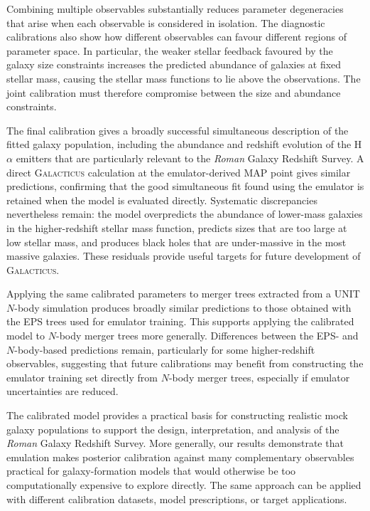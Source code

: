 \documentclass[twocolumn, apj, numberedappendix, iop]{openjournal}
\newcommand{\galacticus}{\textsc{Galacticus}\xspace}
\newcommand{\romanspace}{\textit{Roman}\xspace}
\newcommand{\ha}{H$\alpha$}
\begin{document}
Combining multiple observables substantially reduces parameter degeneracies
that arise when each observable is considered in isolation. The diagnostic
calibrations also show how different observables can favour different regions
of parameter space. In particular, the weaker stellar feedback favoured by
the galaxy size constraints increases the predicted abundance of galaxies at
fixed stellar mass, causing the stellar mass functions to lie above the
observations. The joint calibration must therefore compromise between the
size and abundance constraints.

The final calibration gives a broadly successful simultaneous description of
the fitted galaxy population, including the abundance and redshift evolution
of the \ha{} emitters that are particularly relevant to the \romanspace{} Galaxy
Redshift Survey. A direct \galacticus{} calculation at the emulator-derived
MAP point gives similar predictions, confirming that the good simultaneous
fit found using the emulator is retained when the model is evaluated directly.
Systematic discrepancies nevertheless remain: the model overpredicts the
abundance of lower-mass galaxies in the higher-redshift stellar mass function,
predicts sizes that are too large at low stellar mass, and produces black
holes that are under-massive in the most massive galaxies. These residuals
provide useful targets for future development of \galacticus{}.

Applying the same calibrated parameters to merger trees extracted from a UNIT
\(N\)-body simulation produces broadly similar predictions to those obtained
with the EPS trees used for emulator training. This supports applying the
calibrated model to \(N\)-body merger trees more generally. Differences
between the EPS- and \(N\)-body-based predictions remain, particularly for
some higher-redshift observables, suggesting that future calibrations may
benefit from constructing the emulator training set directly from \(N\)-body
merger trees, especially if emulator uncertainties are reduced.

The calibrated model provides a practical basis for constructing realistic mock galaxy populations to support the design, interpretation, and analysis of the \romanspace{} Galaxy Redshift Survey. More
generally, our results demonstrate that emulation makes posterior calibration
against many complementary observables practical for galaxy-formation models
that would otherwise be too computationally expensive to explore directly.
The same approach can be applied with different calibration datasets, model
prescriptions, or target applications.
\end{document}
